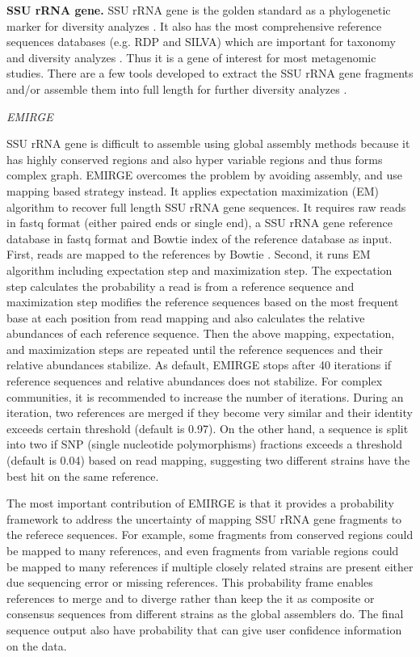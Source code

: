 \documentclass[]{msu-thesis}
\begin{document}
\textbf{SSU rRNA gene. } SSU rRNA gene is the golden standard as a
phylogenetic marker for diversity analyzes
\cite{lane_rapid_1985,huse_exploring_2008}. It also has the most comprehensive
reference sequences databases (e.g. RDP and SILVA) which are important
for taxonomy and diversity analyzes
\cite{cole_ribosomal_2014,quast_silva_2013}. Thus it is a gene of
interest for most metagenomic studies. There are a few tools developed
to extract the SSU rRNA gene fragments and/or assemble them into full
length for further diversity analyzes
\cite{miller_emirge:_2011,yuan_reconstructing_2015,guo_microbial_2015}.

\textit{EMIRGE}


SSU rRNA gene is difficult to assemble using global assembly methods
because it has highly conserved regions and also hyper variable
regions and thus forms complex graph. EMIRGE overcomes the problem by
avoiding assembly, and use mapping based strategy instead. It applies
expectation maximization (EM) algorithm to recover full length SSU
rRNA gene sequences. It requires raw reads in fastq format (either
paired ends or single end), a SSU rRNA gene reference database in
fastq format and Bowtie index of the reference database as
input. First, reads are mapped to the references by Bowtie
\cite{langmead_aligning_2010}. Second, it runs EM algorithm including
expectation step and maximization step. The expectation step
calculates the probability a read is from a reference sequence and
maximization step modifies the reference sequences based on the most
frequent base at each position from read mapping and also calculates
the relative abundances of each reference sequence. Then the above
mapping, expectation, and maximization steps are repeated until the
reference sequences and their relative abundances stabilize. As
default, EMIRGE stops after 40 iterations if reference sequences and
relative abundances does not stabilize. For complex communities, it is
recommended to increase the number of iterations. During an iteration,
two references are merged if they become very similar and their
identity exceeds certain threshold (default is 0.97). On the other
hand, a sequence is split into two if SNP (single nucleotide
polymorphisms) fractions exceeds a threshold (default is 0.04) based
on read mapping, suggesting two different strains have the best hit on
the same reference.

The most important contribution of EMIRGE is that it provides a
probability framework to address the uncertainty of mapping SSU rRNA
gene fragments to the referece sequences. For example, some fragments
from conserved regions could be mapped to many references, and even
fragments from variable regions could be mapped to many references if
multiple closely related strains are present either due sequencing
error or missing references. This probability frame enables references
to merge and to diverge rather than keep the it as composite or
consensus sequences from different strains as the global assemblers
do. The final sequence output also have probability that can give user
confidence information on the data.
\end{document}
